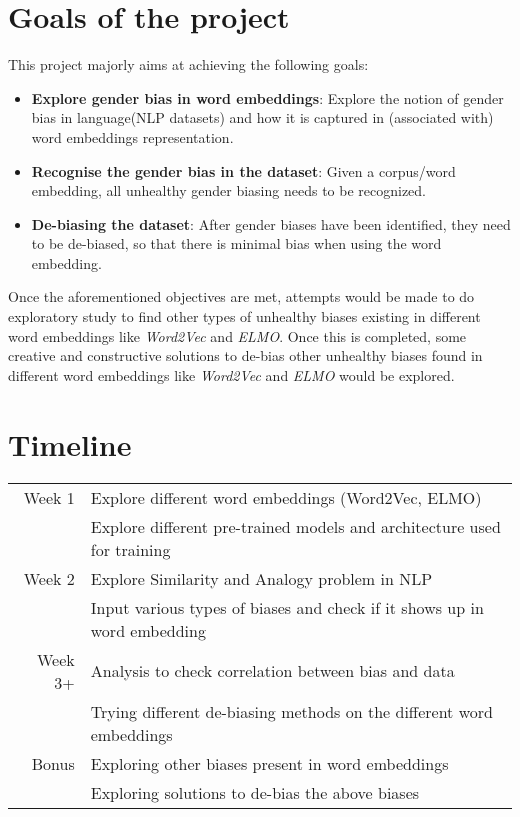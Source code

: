 \documentclass[12pt, a4paper]{article}
\newcommand{\foo}{\hspace{-3pt}$\bullet$ \hspace{5pt}}
\begin{document}
	\section{Goals of the project}
		This project majorly aims at achieving the following goals:
		\begin{itemize}
			\item \textbf{Explore gender bias in word embeddings}: Explore the notion of gender bias in language(NLP datasets) and how it is captured in (associated with) word embeddings representation.
			\item \textbf{Recognise the gender bias in the dataset}: Given a corpus/word embedding, all unhealthy gender biasing needs to be recognized.
			\item \textbf{De-biasing the dataset}: After gender biases have been identified, they need to be de-biased, so that there is minimal bias when using the word embedding.
		\end{itemize}
			Once the aforementioned objectives are met, attempts would be made to do exploratory study to find other types of unhealthy biases existing in different word embeddings like \emph{Word2Vec} and \emph{ELMO}. Once this is completed, some creative and constructive solutions to de-bias other unhealthy biases found in different word embeddings like \emph{Word2Vec} and \emph{ELMO} would be explored.
				
	
	\section{Timeline}
		\renewcommand{\arraystretch}{2.3}
		\begin{tabular}{r |@{\foo} l}
			
			Week 1 & Explore different word embeddings (Word2Vec, ELMO)\\
			& Explore different pre-trained models and architecture used for training\\
			Week 2 & Explore Similarity and Analogy problem in NLP \\
			& Input various types of biases and check if it shows up in word embedding\\
			Week 3+ & Analysis to check correlation between bias and data\\
			& Trying different de-biasing methods on the different word embeddings\\
			Bonus & Exploring other biases present in word embeddings\\
			& Exploring solutions to de-bias the above biases\\
		\end{tabular}
		
\end{document}
